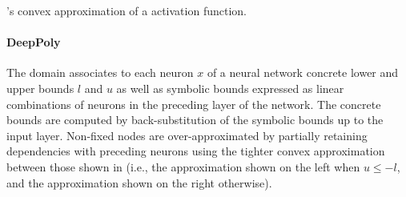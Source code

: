 \begin{marginfigure}
  \caption{\deeppoly's convex approximation of a \relu{} activation function.}
\end{marginfigure}




\paragraph{DeepPoly}

The \deeppoly{} domain  associates to each neuron $x$ of a neural network concrete lower and upper bounds $l$ and $u$ as well as symbolic bounds expressed as linear combinations of neurons in the preceding layer of the network.
%
The concrete bounds are computed by back-substitution of the symbolic bounds up to the input layer. Non-fixed \relu{} nodes are over-approximated by partially retaining dependencies with preceding neurons using the tighter convex approximation between those shown in  (i.e., the approximation shown on the left when $u \leq -l$, and the approximation shown on the right otherwise).

